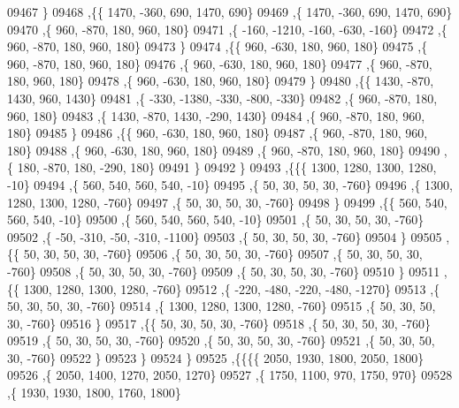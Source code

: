 \begin{DoxyCode}
09467     \}
09468    ,\{\{  1470,  -360,   690,  1470,   690\}
09469     ,\{  1470,  -360,   690,  1470,   690\}
09470     ,\{   960,  -870,   180,   960,   180\}
09471     ,\{  -160, -1210,  -160,  -630,  -160\}
09472     ,\{   960,  -870,   180,   960,   180\}
09473     \}
09474    ,\{\{   960,  -630,   180,   960,   180\}
09475     ,\{   960,  -870,   180,   960,   180\}
09476     ,\{   960,  -630,   180,   960,   180\}
09477     ,\{   960,  -870,   180,   960,   180\}
09478     ,\{   960,  -630,   180,   960,   180\}
09479     \}
09480    ,\{\{  1430,  -870,  1430,   960,  1430\}
09481     ,\{  -330, -1380,  -330,  -800,  -330\}
09482     ,\{   960,  -870,   180,   960,   180\}
09483     ,\{  1430,  -870,  1430,  -290,  1430\}
09484     ,\{   960,  -870,   180,   960,   180\}
09485     \}
09486    ,\{\{   960,  -630,   180,   960,   180\}
09487     ,\{   960,  -870,   180,   960,   180\}
09488     ,\{   960,  -630,   180,   960,   180\}
09489     ,\{   960,  -870,   180,   960,   180\}
09490     ,\{   180,  -870,   180,  -290,   180\}
09491     \}
09492    \}
09493   ,\{\{\{  1300,  1280,  1300,  1280,   -10\}
09494     ,\{   560,   540,   560,   540,   -10\}
09495     ,\{    50,    30,    50,    30,  -760\}
09496     ,\{  1300,  1280,  1300,  1280,  -760\}
09497     ,\{    50,    30,    50,    30,  -760\}
09498     \}
09499    ,\{\{   560,   540,   560,   540,   -10\}
09500     ,\{   560,   540,   560,   540,   -10\}
09501     ,\{    50,    30,    50,    30,  -760\}
09502     ,\{   -50,  -310,   -50,  -310, -1100\}
09503     ,\{    50,    30,    50,    30,  -760\}
09504     \}
09505    ,\{\{    50,    30,    50,    30,  -760\}
09506     ,\{    50,    30,    50,    30,  -760\}
09507     ,\{    50,    30,    50,    30,  -760\}
09508     ,\{    50,    30,    50,    30,  -760\}
09509     ,\{    50,    30,    50,    30,  -760\}
09510     \}
09511    ,\{\{  1300,  1280,  1300,  1280,  -760\}
09512     ,\{  -220,  -480,  -220,  -480, -1270\}
09513     ,\{    50,    30,    50,    30,  -760\}
09514     ,\{  1300,  1280,  1300,  1280,  -760\}
09515     ,\{    50,    30,    50,    30,  -760\}
09516     \}
09517    ,\{\{    50,    30,    50,    30,  -760\}
09518     ,\{    50,    30,    50,    30,  -760\}
09519     ,\{    50,    30,    50,    30,  -760\}
09520     ,\{    50,    30,    50,    30,  -760\}
09521     ,\{    50,    30,    50,    30,  -760\}
09522     \}
09523    \}
09524   \}
09525  ,\{\{\{\{  2050,  1930,  1800,  2050,  1800\}
09526     ,\{  2050,  1400,  1270,  2050,  1270\}
09527     ,\{  1750,  1100,   970,  1750,   970\}
09528     ,\{  1930,  1930,  1800,  1760,  1800\}

\end{DoxyCode}

